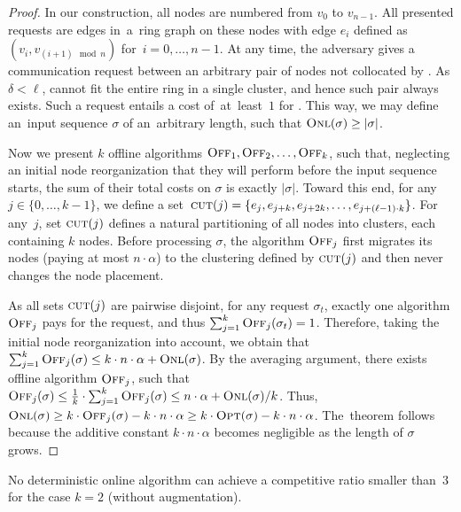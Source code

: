 \begin{proof}
In our construction, all nodes are numbered from $v_0$ to $v_{n-1}$. All
presented requests are edges in~a~ring graph on these nodes with edge $e_i$
defined as $(v_i,v_{(i+1) \mod n })$ for~$i = 0, \ldots, n-1$. At any time,
the adversary gives a communication request between an arbitrary pair of nodes
not collocated by \ONL. As $\delta < \ell$, \ONL cannot fit the entire ring in
a single cluster, and hence such pair always exists. Such a request
entails a cost of~at~least~$1$ for \ONL. This way, we may define an~input
sequence $\sigma$ of an~arbitrary length, such that $\textsc{Onl}(\sigma) \geq
|\sigma|$.

Now we present $k$ offline algorithms $\textsc{Off}_1, \textsc{Off}_2, \ldots, \textsc{Off}_k$, such
that, neglecting an initial node reorganization that they will perform before
the input sequence starts, the sum of their total costs on $\sigma$ is exactly
$|\sigma|$. Toward this end, for any $j \in \{0,\ldots,k-1\}$, we define a
set~$\textsc{cut}(j) = \{ e_j, e_{j+k}, e_{j+2k},
\ldots, e_{j+(\ell-1)\cdot k} \}$. For any~$j$, set $\textsc{cut}(j)$ defines a
natural partitioning of all nodes into clusters, each containing $k$ nodes.
Before processing $\sigma$, the algorithm $\textsc{Off}_j$ first migrates its nodes
(paying at most $n \cdot \alpha$) to the clustering defined by $\textsc{cut}(j)$ and
then never changes the node placement.

As all sets $\textsc{cut}(j)$ are pairwise disjoint, for any request $\sigma_t$,
exactly one algorithm $\textsc{Off}_j$ pays for the request, and thus $\sum_{j=1}^k
\textsc{Off}_j(\sigma_t) = 1$. Therefore, taking the initial node reorganization into
account, we obtain that $\sum_{j=1}^k \textsc{Off}_j(\sigma) \leq k \cdot n \cdot
\alpha + \textsc{Onl}(\sigma)$. By the averaging argument, there exists offline
algorithm $\textsc{Off}_j$, such that $\textsc{Off}_j(\sigma) \leq \frac{1}{k} \cdot
\sum_{j=1}^k \textsc{Off}_j(\sigma) \leq n \cdot \alpha + \textsc{Onl}(\sigma) / k$.
Thus, $\textsc{Onl}(\sigma) \geq k \cdot \textsc{Off}_j(\sigma) - k \cdot n \cdot
\alpha \geq k \cdot \textsc{Opt}(\sigma) - k \cdot n \cdot \alpha$.
The~theorem follows because the additive constant $k \cdot n \cdot \alpha$
becomes negligible as the length of $\sigma$ grows.
\end{proof}


\begin{theorem}
No deterministic online algorithm \ONL can achieve a competitive ratio 
smaller than~$3$ for the case $k = 2$ (without augmentation).
\end{theorem}

